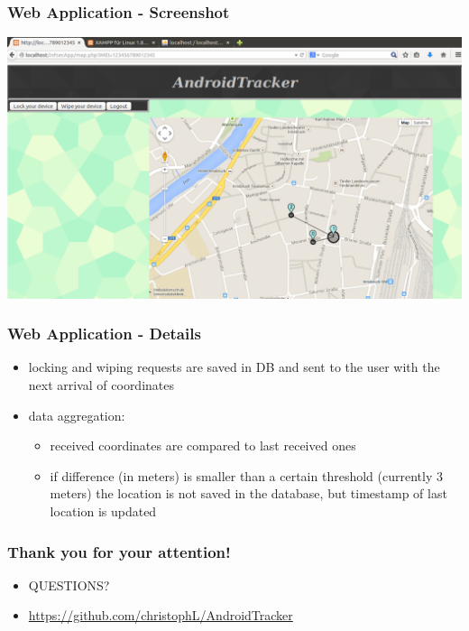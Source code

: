 \documentclass[darktitle]{beamer}
\begin{document}
	\begin{frame}
		\frametitle{Web Application - Screenshot}
		\begin{center}
		\includegraphics[height=0.75\textheight]{figures/webApp_map.pdf}
		\end{center}
	\end{frame}

	\begin{frame}
		\frametitle{Web Application - Details}
		\begin{itemize}
			\item locking and wiping requests are saved in DB and sent to the user with the next arrival of coordinates
			\item data aggregation:
			\begin{itemize}
			\item received coordinates are compared to last received ones
			\item if difference (in meters) is smaller than a certain threshold (currently 3 meters) the location is not saved in the database, but timestamp of last location is updated
			\end{itemize}
		\end{itemize}
	\end{frame}


	\begin{frame}
		\frametitle{Thank you for your attention!}
		\begin{itemize}
			\item[] \huge{QUESTIONS?}
			\item \normalsize{\url{https://github.com/christophL/AndroidTracker}}
		\end{itemize}
	\end{frame}

	
\end{document}
